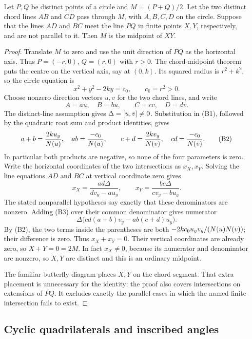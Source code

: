 \begin{theorem}
\label{circ:butterfly}
Let $P,Q$ be distinct points of a circle and $M=(P+Q)/2$.
Let the two distinct chord lines $AB$ and $CD$ pass through $M$, with
$A,B,C,D$ on the circle.  Suppose that the lines $AD$ and $BC$ meet the
line $PQ$ in finite points $X,Y$, respectively, and are not parallel to it.
Then $M$ is the midpoint of $XY$.
\end{theorem}
\begin{proof}
Translate $M$ to zero and use the unit direction of $PQ$ as the horizontal
axis.  Thus $P=(-r,0)$, $Q=(r,0)$ with $r>0$.
The chord-midpoint theorem puts the centre on the vertical axis, say at
$(0,k)$.  Its squared radius is $r^2+k^2$, so the circle equation is
\[
 x^2+y^2-2ky=c_0,\qquad c_0=r^2>0.                 \tag{B1}
\]
Choose nonzero direction vectors $u,v$ for the two chord lines, and write
\[
 A=au,\quad B=bu,\qquad C=cv,\quad D=dv.
\]
The distinct-line assumption gives $\Delta=[u,v]\ne0$.
Substitution in (B1), followed by the quadratic root sum and product
identities, gives
\[
 a+b=\frac{2ku_y}{N(u)},\quad ab=\frac{-c_0}{N(u)},
 \qquad
 c+d=\frac{2kv_y}{N(v)},\quad cd=\frac{-c_0}{N(v)}.        \tag{B2}
\]
In particular both products are negative, so none of the four parameters
is zero.  Write the horizontal coordinates of the two intersections as
$x_X,x_Y$.  Solving the line equations $AD$ and $BC$ at vertical
coordinate zero gives
\[
 x_X=\frac{ad\Delta}{dv_y-au_y},\qquad
 x_Y=\frac{bc\Delta}{cv_y-bu_y}.                     \tag{B3}
\]
The stated nonparallel hypotheses say exactly that these denominators
are nonzero.  Adding (B3) over their common denominator gives numerator
\[
 \Delta\bigl(cd(a+b)v_y-ab(c+d)u_y\bigr).
\]
By (B2), the two terms inside the parentheses are both
$-2kc_0u_yv_y/(N(u)N(v))$; their difference is zero.
Thus $x_X+x_Y=0$.  Their vertical coordinates are already zero, so
$X+Y=0=2M$.  In fact $x_X\ne0$, because its numerator and denominator
are nonzero, so $X,Y$ are distinct and this is an ordinary midpoint.

The familiar butterfly diagram places $X,Y$ on the chord segment.
That extra placement is unnecessary for the identity: the proof also
covers intersections on extensions of $PQ$.  It excludes exactly the
parallel cases in which the named finite intersection fails to exist.
\end{proof}

\subsection{Cyclic quadrilaterals and inscribed angles}

